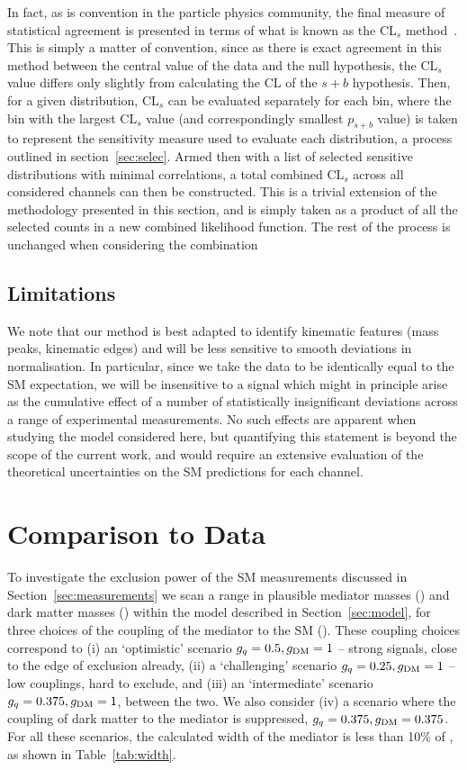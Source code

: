 \documentclass[floatfix]{article}
\begin{document}
In fact, as is convention in the particle physics community, the final measure of statistical agreement is presented in terms of what is known as the CL$_{s}$ 
method~\cite{Junk:1999kv,Read:2002hq}. This is simply a matter of convention, since as there is exact agreement in this method between the central value of the 
data and the null hypothesis, the CL$_{s}$ value differs only slightly from calculating the CL of the $s+b$ hypothesis. Then, for a given distribution, CL$_{s}$ 
can be evaluated separately for each bin, where the bin with the largest CL$_{s}$ value (and correspondingly smallest $p_{s+b}$ value) is taken to represent the 
sensitivity measure used to evaluate each distribution, a process outlined in section~\ref{sec:selec}. Armed then with a list of selected sensitive 
distributions with minimal correlations, a total combined CL$_{s}$ across all considered channels can then be constructed. This is a trivial extension of 
the methodology presented in this section, and is simply taken as a product of all the selected counts in a new combined likelihood function. 
The rest of the process is unchanged when considering the combination


\subsection{Limitations}

We note that our method is best adapted to identify kinematic features (mass peaks, kinematic edges) and will be less sensitive to smooth
deviations in normalisation. In particular, since we take the data to be identically equal to the SM expectation, we will be insensitive 
to a signal which might in principle arise as the cumulative effect of a number of statistically insignificant deviations 
across a range of experimental measurements.
No such effects are apparent when studying the model considered here, but quantifying this statement is beyond the scope of the current work, 
and would require an extensive evaluation of the theoretical uncertainties on the SM predictions for each channel.


\section{Comparison to Data}\label{sec:kinematics}

To investigate the exclusion power of the SM measurements discussed in Section~\ref{sec:measurements} we scan a range in 
plausible mediator masses (\MZP) and dark matter masses (\MDM) within the model described in Section~\ref{sec:model}, for three choices of
the coupling of the mediator to the SM (\GQ). These coupling choices correspond to (i) an `optimistic' scenario $g_{q} = 0.5, g_{\rm DM} = 1$ -- strong signals, 
close to the edge of exclusion already, (ii) a `challenging' scenario $g_{q} = 0.25, g_{\rm DM} = 1$ -- low couplings, hard to exclude, 
and (iii) an `intermediate' scenario $g_{q} = 0.375, g_{\rm DM} = 1$, between the two. We also consider (iv) a scenario where the coupling of dark matter to the mediator is
suppressed, $g_{q} = 0.375, g_{\rm DM} = 0.375$. For all these scenarios, the calculated width of the mediator is less than 10\% of \MZP, as shown in Table~\ref{tab:width}.
\end{document}
